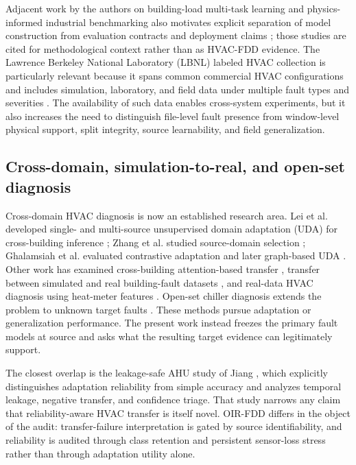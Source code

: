 \documentclass[preprint,12pt]{elsarticle}
\begin{document}
Adjacent work by the authors on building-load multi-task learning and physics-informed industrial benchmarking also motivates explicit separation of model construction from evaluation contracts and deployment claims \cite{liu2023load,su2026pdm}; those studies are cited for methodological context rather than as HVAC-FDD evidence. The Lawrence Berkeley National Laboratory (LBNL) labeled HVAC collection is particularly relevant because it spans common commercial HVAC configurations and includes simulation, laboratory, and field data under multiple fault types and severities \cite{granderson2023dataset}. The availability of such data enables cross-system experiments, but it also increases the need to distinguish file-level fault presence from window-level physical support, split integrity, source learnability, and field generalization.

\subsection{Cross-domain, simulation-to-real, and open-set diagnosis}
Cross-domain HVAC diagnosis is now an established research area. Lei et al. developed single- and multi-source unsupervised domain adaptation (UDA) for cross-building inference \cite{lei2025}; Zhang et al. studied source-domain selection \cite{zhang2025source}; Ghalamsiah et al. evaluated contrastive adaptation \cite{ghalamsiah2025can} and later graph-based UDA \cite{ghalamsiah2026graph}. Other work has examined cross-building attention-based transfer \cite{wang2026cross}, transfer between simulated and real building-fault datasets \cite{huang2022real}, and real-data HVAC diagnosis using heat-meter features \cite{vasman2026heat}. Open-set chiller diagnosis extends the problem to unknown target faults \cite{gao2026open}. These methods pursue adaptation or generalization performance. The present work instead freezes the primary fault models at source and asks what the resulting target evidence can legitimately support.

The closest overlap is the leakage-safe AHU study of Jiang \cite{jiang2026leakage}, which explicitly distinguishes adaptation reliability from simple accuracy and analyzes temporal leakage, negative transfer, and confidence triage. That study narrows any claim that reliability-aware HVAC transfer is itself novel. OIR-FDD differs in the object of the audit: transfer-failure interpretation is gated by source identifiability, and reliability is audited through class retention and persistent sensor-loss stress rather than through adaptation utility alone.
\end{document}
